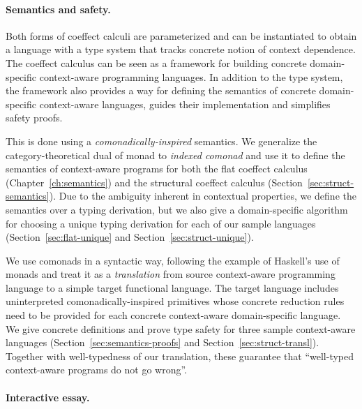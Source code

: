 
\paragraph{Semantics and safety.}

Both forms of coeffect calculi are parameterized and can be instantiated to obtain a language with
a type system that tracks concrete notion of context dependence. The coeffect calculus can be seen
as a framework for building concrete domain-specific context-aware programming languages. In
addition to the type system, the framework also provides a way for defining the semantics of
concrete domain-specific context-aware languages, guides their implementation and simplifies
safety proofs.

This is done using a \emph{comonadically-inspired} semantics. We generalize the category-theoretical
dual of monad to \emph{indexed comonad} and use it to define the semantics of context-aware
programs for both the flat coeffect calculus (Chapter~\ref{ch:semantics}) and the structural coeffect
calculus (Section~\ref{sec:struct-semantics}). Due to the ambiguity inherent in contextual properties,
we define the semantics over a typing derivation, but we also give a domain-specific algorithm for
choosing a unique typing derivation for each of our sample languages (Section~\ref{sec:flat-unique}
and Section~\ref{sec:struct-unique}).

We use comonads in a syntactic way, following the example of Haskell's use of monads and treat
it as a \emph{translation} from source context-aware programming language to a simple target
functional language. The target language includes uninterpreted comonadically-inspired primitives
whose concrete reduction rules need to be provided for each concrete context-aware domain-specific
language. We give concrete definitions and prove type safety for three sample context-aware
languages (Section~\ref{sec:semantics-proofs} and Section~\ref{sec:struct-transl}). Together with
well-typedness of our translation, these guarantee that ``well-typed context-aware programs do
not go wrong''.


\paragraph{Interactive essay.}

